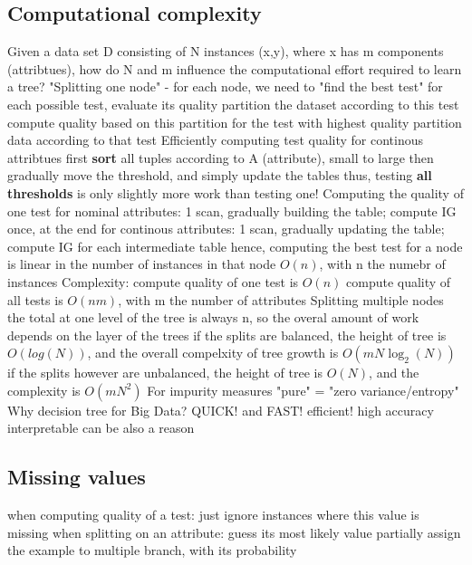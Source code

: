 \subsection{Computational complexity}
\begin{outline}
    \1 Given a data set D consisting of N instances (x,y), where x has m components (attribtues), how do N and m influence the computational effort required to learn a tree?
    \1 "Splitting one node" - for each node, we need to "find the best test"
        \2 for each possible test, evaluate its quality
            \3 partition the dataset according to this test
            \3 compute quality based on this partition
        \2 for the test with highest quality
            \3 partition data according to that test
    \1 Efficiently computing test quality for continous attribtues
        \2 first \textbf{sort} all tuples according to A (attribute), small to large
        \2 then gradually move the threshold, and simply update the tables
        \2 thus, testing \textbf{all thresholds} is only slightly more work than testing one!
    \1 Computing the quality of one test
        \2 for nominal attributes: 1 scan, gradually building the table; compute IG once, at the end
        \2 for continous attributes: 1 scan, gradually updating the table; compute IG for each intermediate table
        \2 hence, computing the best test for a node is linear in the number of instances in that node $O(n)$, with n the numebr of instances
        \2 Complexity:
            \3 compute quality of one test is $O(n)$
            \3 compute quality of all tests is $O(nm)$, with m the number of attributes
    \1 Splitting multiple nodes
        \2 the total at one level of the tree is always n, so the overal amount of work depends on the layer of the trees
            \3 if the splits are balanced, the height of tree is $O(log(N))$, and the overall compelxity of tree growth is $O(mN\log_{2}(N))$
            \3 if the splits however are unbalanced, the height of tree is $O(N)$, and the complexity is $O(mN^{2})$
    \1 For impurity measures
        \2 "pure" = "zero variance/entropy"
    \1 Why decision tree for Big Data?
        \2 QUICK! and FAST! efficient!
        \2 high accuracy
        \2 interpretable can be also a reason
\end{outline}

\subsection{Missing values}
\begin{outline}
    \1 when computing quality of a test: just ignore instances where this value is missing
    \1 when splitting on an attribute:
        \2 guess its most likely value
        \2 partially assign the example to multiple branch, with its probability
\end{outline}

